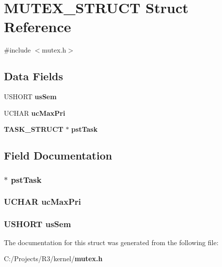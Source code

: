 \section{MUTEX\_\-STRUCT Struct Reference}
\label{struct_m_u_t_e_x___s_t_r_u_c_t}


{\ttfamily \#include $<$mutex.h$>$}\subsection*{Data Fields}
\begin{DoxyCompactItemize}
\item 
USHORT {\bf usSem}
\item 
UCHAR {\bf ucMaxPri}
\item 
{\bf TASK\_\-STRUCT} $\ast$ {\bf pstTask}
\end{DoxyCompactItemize}


\subsection{Field Documentation}
\subsubsection[{pstTask}]{$\ast$ {\bf pstTask}}\label{struct_m_u_t_e_x___s_t_r_u_c_t_a4618a48c8e1a4c67b6f49bf6e75b510d}
\subsubsection[{ucMaxPri}]{\setlength{\rightskip}{0pt plus 5cm}UCHAR {\bf ucMaxPri}}\label{struct_m_u_t_e_x___s_t_r_u_c_t_a2b222a968ddbe4ad41493f1c299a7c58}
\subsubsection[{usSem}]{\setlength{\rightskip}{0pt plus 5cm}USHORT {\bf usSem}}\label{struct_m_u_t_e_x___s_t_r_u_c_t_a6c42a3763ca51563595b79ccf650991c}


The documentation for this struct was generated from the following file:\begin{DoxyCompactItemize}
\item 
C:/Projects/R3/kernel/{\bf mutex.h}\end{DoxyCompactItemize}
